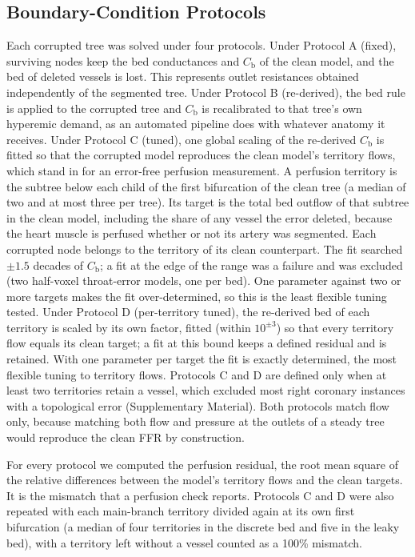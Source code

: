 \documentclass[journal,twoside,web]{ieeecolor}
\begin{document}
\subsection{Boundary-Condition Protocols}
Each corrupted tree was solved under four protocols. Under Protocol A (fixed), surviving
nodes keep the bed conductances and $C_\mathrm{b}$ of the clean model, and the bed of deleted vessels is lost. This represents
outlet resistances obtained independently of the segmented tree. Under Protocol B
(re-derived), the bed rule is applied to the corrupted tree and $C_\mathrm{b}$ is recalibrated to that tree's own hyperemic
demand, as an automated pipeline does with whatever anatomy it receives. Under Protocol C (tuned), one global
scaling of the re-derived $C_\mathrm{b}$ is fitted so that the corrupted model reproduces the clean model's territory
flows, which stand in for an error-free perfusion measurement. A perfusion territory is the subtree below each child of
the first bifurcation of the clean tree (a median of two and at most three per tree). Its target is the total bed outflow of that subtree in the clean model,
including the share of any vessel the error deleted, because the heart muscle is perfused whether or not its artery
was segmented. Each corrupted node belongs to the territory of its clean counterpart. The fit searched $\pm 1.5$ decades
of $C_\mathrm{b}$; a fit at the edge of the range was a failure and was excluded (two half-voxel throat-error models, one per bed).
One parameter against two or more targets makes the fit over-determined, so this is the least flexible tuning tested. Under Protocol D (per-territory tuned), the re-derived bed of each territory is scaled by its
own factor, fitted (within $10^{\pm 3}$) so that every territory flow equals its clean target; a fit at this bound keeps a defined residual and is retained. With one parameter per target the fit is
exactly determined, the most flexible tuning to territory flows. Protocols C and D are defined only when at least two territories retain a vessel, which excluded most right coronary
instances with a topological error (Supplementary Material). Both protocols match
flow only, because matching both flow and pressure at the outlets of a steady tree would reproduce the clean FFR by
construction.

For every protocol we computed the perfusion residual, the root mean square of the relative differences between the
model's territory flows and the clean targets. It is the mismatch that a perfusion check reports. Protocols C and D
were also repeated with each main-branch territory divided again at its own first bifurcation (a median of four
territories in the discrete bed and five in the leaky bed), with a territory left without a vessel counted as a
100\% mismatch.
\end{document}
